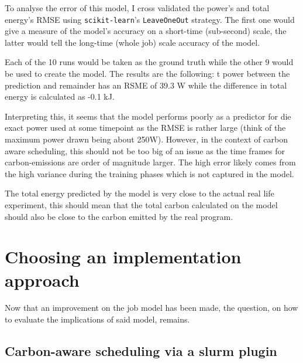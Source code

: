 To analyse the error of this model, I cross validated the power's and total energy's RMSE using \verb|scikit-learn|'s \verb|LeaveOneOut| strategy. 
The first one would give a measure of the model's accuracy on a short-time (sub-second) scale, the latter would  tell the long-time (whole job) scale accuracy of the model.

Each of the 10 runs would be taken as the ground truth while the other 9 would be used to create the model. The results are the following: t power between the prediction and remainder has an RSME of 39.3 W while the difference in total energy is calculated as -0.1 kJ. 

Interpreting this, it seems that the model performs poorly as a predictor for die exact power used at some timepoint as the RMSE is rather large (think of the maximum power drawn being about 250W). 
However, in the context of carbon aware scheduling, this should not be too big of an issue as the time frames for carbon-emissions are order of magnitude larger. 
The high error likely comes from the high variance during the training phases which is not captured in the model.

The total energy predicted by the model is very close to the actual real life experiment, this should mean that the total carbon calculated on the model should also be close to the carbon emitted by the real program.

\section{Choosing an implementation approach}

Now that an improvement on the job model has been made, the question, on how to evaluate the implications of said model, remains. 



\subsection{Carbon-aware scheduling via a slurm plugin}
\label{subsec:slurm_plugin}

